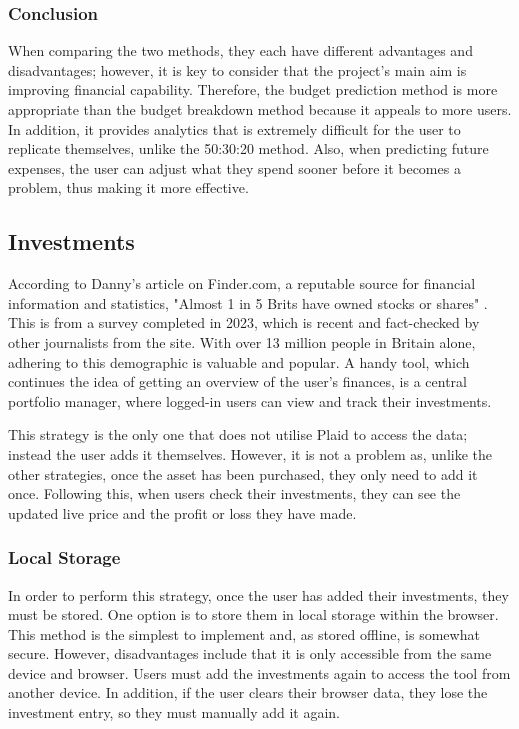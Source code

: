 \subsubsection{Conclusion}
When comparing the two methods, they each have different advantages and disadvantages; however, it is key to consider that the project's main aim is improving financial capability. Therefore, the budget prediction method is more appropriate than the budget breakdown method because it appeals to more users. In addition, it provides analytics that is extremely difficult for the user to replicate themselves, unlike the 50:30:20 method. Also, when predicting future expenses, the user can adjust what they spend sooner before it becomes a problem, thus making it more effective.

\subsection{Investments}
According to Danny's article on Finder.com, a reputable source for financial information and statistics, "Almost 1 in 5 Brits have owned stocks or shares" \cite{InvestmentStats}. This is from a survey completed in 2023, which is recent and fact-checked by other journalists from the site. With over 13 million people in Britain alone, adhering to this demographic is valuable and popular. A handy tool, which continues the idea of getting an overview of the user's finances, is a central portfolio manager, where logged-in users can view and track their investments. 

This strategy is the only one that does not utilise Plaid to access the data; instead the user adds it themselves. However, it is not a problem as, unlike the other strategies, once the asset has been purchased, they only need to add it once. Following this, when users check their investments, they can see the updated live price and the profit or loss they have made.

\subsubsection{Local Storage}
In order to perform this strategy, once the user has added their investments, they must be stored. One option is to store them in local storage within the browser. This method is the simplest to implement and, as stored offline, is somewhat secure. However, disadvantages include that it is only accessible from the same device and browser. Users must add the investments again to access the tool from another device. In addition, if the user clears their browser data, they lose the investment entry, so they must manually add it again.

